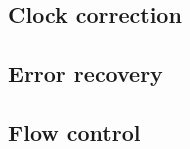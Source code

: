 		\subsection{Clock correction}
			
		
		\subsection{Error recovery}
			
		
		\subsection{Flow control}
			
